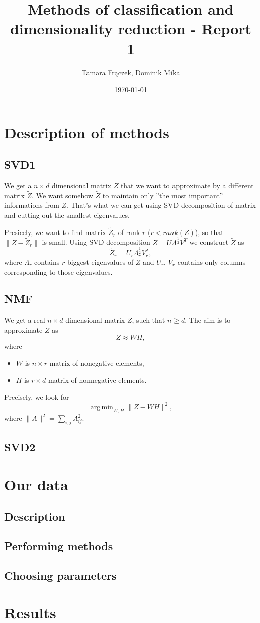\documentclass[11pt]{amsart}
\author{Tamara Frączek, Dominik Mika}
\title{Methods of classification and dimensionality reduction - Report 1}
\date{\today}
\DeclareMathOperator*{\argmin}{arg\,min}
\begin{document}
\maketitle


\section{Description of methods}
\subsection*{SVD1}

We get a $n \times d$ dimensional matrix $Z$ that we want to approximate by a different matrix $\tilde{Z}$.
We want somehow $\tilde{Z}$ to maintain only ''the most important'' informations from $Z$.
That's what we can get using SVD decomposition of matrix and cutting out the smallest eigenvalues.

Presicely, we want to find matrix $\tilde{Z}_r$ of rank $r$ ($r < rank(Z)$), so that $\|Z - \tilde{Z}_r\|$ is small.
Using SVD decomposition $Z = U \Lambda^{\frac{1}{2}} V^T$ we construct $\tilde{Z}$ as
\[\tilde{Z}_r = U_r \Lambda_r^{\frac{1}{2}}V_r^T,\]
where $\Lambda_r$ contains $r$ biggest eigenvalues of $Z$ and $U_r$, $V_r$ contains only columns corresponding to those eigenvalues.


\subsection*{NMF}
We get a real $n \times d$ dimensional matrix $Z$, such that $n \ge d$.
The aim is to approximate $Z$ as
\[Z \approx WH,\]
where
\begin{itemize}
    \item $W$ is $n \times r$ matrix of nonegative elements,
    \item $H$ is $r \times d$ matrix of nonnegative elements.
\end{itemize}
Precisely, we look for
\[\argmin_{W, H} \|Z - WH \|^2,\]
where $\|A\|^2 = \sum_{i, j} A_{ij}^2$.


\subsection*{SVD2}

\section{Our data}
\subsection*{Description}
\subsection*{Performing methods}
\subsection*{Choosing parameters}

\section{Results}
\end{document}

